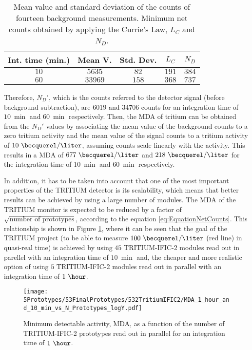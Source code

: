\begin{table}[htbp]
\centering{}%
\begin{tabular}{ccccc}
\toprule 
Int. time (min.) & Mean V. & Std. Dev. & $L_C$ & $N_D$ \tabularnewline
\midrule
\midrule 
$10$ & $5635$ & $82$ & $191$ & $384$ \tabularnewline
$60$ & $33969$ & $158$ & $368$ & $737$ \tabularnewline
\bottomrule
\end{tabular}
\caption{Mean value and standard deviation of the counts of fourteen background measurements. Minimum net counts obtained by applying the Currie's Law, $L_C$ and $N_D$.}
\label{tab:CurrieLawTRITIUMIFIC2}
\end{table}

Therefore, $N_D'$, which is the counts referred to the detector signal (before background subtraction), are $6019$ and $34706$ counts for an integration time of $10~\min$ and $60~\min$ respectively. Then, the MDA of tritium can be obtained from the $N_D'$ values by associating the mean value of the background counts to a zero tritium activity and the mean value of the signal counts to a tritium activity of $10~\becquerel/\liter$, assuming counts scale linearly with the activity. This results in a MDA of $677~\becquerel/\liter$ and $218~\becquerel/\liter$ for the integration time of $10~\min$ and $60~\min$ respectively. 

In addition, it has to be taken into account that one of the most important properties of the TRITIUM detector is its scalability, which means that better results can be achieved by using a large number of modules. The MDA of the TRITIUM monitor is expected to be reduced by a factor of $\sqrt{\text{number of prototypes}}$, according to the equation \ref{eq:EquationNetCounts}. This relationship is shown in Figure \ref{fig:MDATRITIUMmonitor}, where it can be seen that the goal of the TRITIUM project (to be able to measure $100~\becquerel/\liter$ (red line) in quasi-real time) is achieved by using $45$ TRITIUM-IFIC-2 modules read out in parellel with an integration time of $10~\min$ and, the cheaper and more realistic option of using $5$ TRITIUM-IFIC-2 modules read out in parallel with an integration time of $1~\hour$. %

\begin{figure}[h]
\centering
\texttt{[image: 5Prototypes/53FinalPrototypes/532TritiumIFIC2/MDA\_1\_hour\_and\_10\_min\_vs\_N\_Prototypes\_logY.pdf]}
\caption{Minimum detectable activity, MDA, as a function of the number of TRITIUM-IFIC-2 prototypes read out in parallel for an integration time of $1~\hour$. \label{fig:MDATRITIUMmonitor}}
\end{figure}


